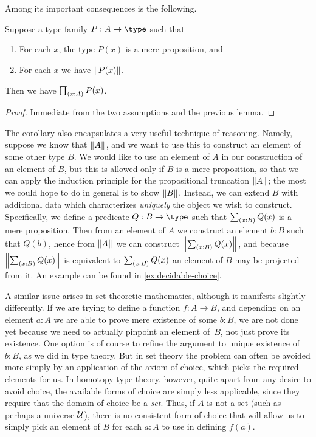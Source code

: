 Among its important consequences is the following.

\begin{cor}\label{cor:UC}
  Suppose a type family $P:A\to \type$ such that
  \begin{enumerate}
  \item For each $x$, the type $P(x)$ is a mere proposition, and
  \item For each $x$ we have $\mathopen{}\left\Vert P(x)\right\Vert_{}\mathclose{}$.
  \end{enumerate}
  Then we have $\prd{x:A} P(x)$.
\end{cor}
\begin{proof}
  Immediate from the two assumptions and the previous lemma.
\end{proof}

The corollary also encapsulates a very useful technique of reasoning.
Namely, suppose we know that $\mathopen{}\left\Vert A\right\Vert_{}\mathclose{}$, and we want to use this to construct an element of some other type $B$.
We would like to use an element of $A$ in our construction of an element of $B$, but this is allowed only if $B$ is a mere proposition, so that we can apply the induction principle for the propositional truncation $\mathopen{}\left\Vert A\right\Vert_{}\mathclose{}$; the most we could hope to do in general is to show $\mathopen{}\left\Vert B\right\Vert_{}\mathclose{}$.
%
Instead, we can extend $B$ with additional data which characterizes \emph{uniquely} the object we wish to construct.
Specifically, we define a predicate $Q:B\to\type$ such that $\sm{x:B} Q(x)$ is a mere proposition.
Then from an element of $A$ we construct an element $b:B$ such that $Q(b)$, hence from $\mathopen{}\left\Vert A\right\Vert_{}\mathclose{}$ we can construct $\brck{\sm{x:B} Q(x)}$, and because $\brck{\sm{x:B} Q(x)}$ is equivalent to $\sm{x:B} Q(x)$ an element of $B$ may be projected from it.
An example can be found in \autoref{ex:decidable-choice}.

A similar issue arises in set-theoretic mathematics, although it manifests slightly
differently. If we are trying to define a function $f: A \to B$, and depending on an
element $a : A$ we are able to prove mere existence of some $b : B$, we are not done yet
because we need to actually pinpoint an element of~$B$, not just prove its existence.
One option is of course to refine the argument to unique existence of $b : B$, as we did in type theory. But in set theory the problem can often be avoided more simply by an application of the axiom of choice, which picks the required elements for us.
In homotopy type theory, however, quite apart from any desire to avoid choice, the available forms of choice are simply less applicable, since they require that the domain of choice be a \emph{set}.
Thus, if $A$ is not a set (such as perhaps a universe $\mathcal{U}$), there is no consistent form of choice that will allow us to simply pick an element of $B$ for each $a : A$ to use in defining $f(a)$.

